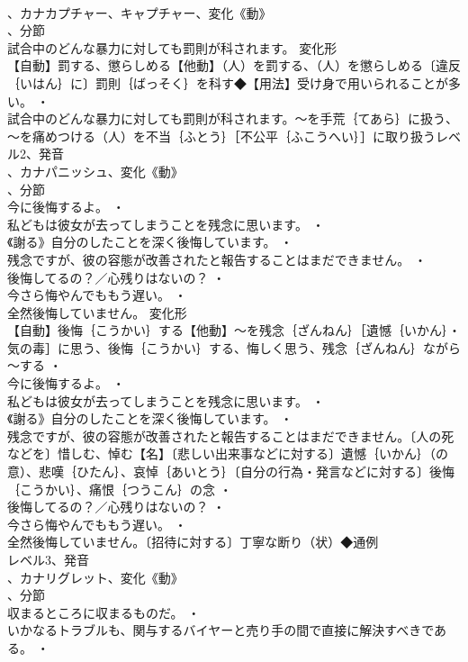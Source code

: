\documentclass[8pt]{extreport}
\begin{document}
\begin{CJK}{UTF8}{min}
\\	、カナカプチャー、キャプチャー、変化《動》
\\	、分節
\\	試合中のどんな暴力に対しても罰則が科されます。	変化形 
\\	【自動】罰する、懲らしめる【他動】（人）を罰する、（人）を懲らしめる〔違反｛いはん｝に〕罰則｛ばっそく｝を科す◆【用法】受け身で用いられることが多い。 ・
\\	試合中のどんな暴力に対しても罰則が科されます。～を手荒｛てあら｝に扱う、～を痛めつける（人）を不当｛ふとう｝［不公平｛ふこうへい｝］に取り扱うレベル2、発音
\\	、カナパニッシュ、変化《動》
\\	、分節
\\	今に後悔するよ。 ・
\\	私どもは彼女が去ってしまうことを残念に思います。 ・
\\	《謝る》自分のしたことを深く後悔しています。 ・
\\	残念ですが、彼の容態が改善されたと報告することはまだできません。 ・
\\	後悔してるの？／心残りはないの？ ・
\\	今さら悔やんでももう遅い。 ・
\\	全然後悔していません。	変化形 
\\	【自動】後悔｛こうかい｝する【他動】～を残念｛ざんねん｝［遺憾｛いかん｝・気の毒］に思う、後悔｛こうかい｝する、悔しく思う、残念｛ざんねん｝ながら～する ・
\\	今に後悔するよ。 ・
\\	私どもは彼女が去ってしまうことを残念に思います。 ・
\\	《謝る》自分のしたことを深く後悔しています。 ・
\\	残念ですが、彼の容態が改善されたと報告することはまだできません。〔人の死などを〕惜しむ、悼む【名】〔悲しい出来事などに対する〕遺憾｛いかん｝（の意）、悲嘆｛ひたん｝、哀悼｛あいとう｝〔自分の行為・発言などに対する〕後悔｛こうかい｝、痛恨｛つうこん｝の念 ・
\\	後悔してるの？／心残りはないの？ ・
\\	今さら悔やんでももう遅い。 ・
\\	全然後悔していません。〔招待に対する〕丁寧な断り（状）◆通例
\\	レベル3、発音
\\	、カナリグレット、変化《動》
\\	、分節
\\	収まるところに収まるものだ。 ・
\\	いかなるトラブルも、関与するバイヤーと売り手の間で直接に解決すべきである。 ・

\end{CJK}
\end{document}
